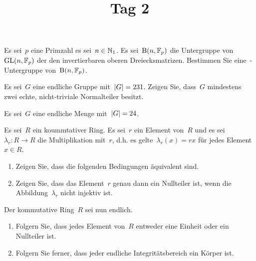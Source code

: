 \documentclass{scrartcl}
\title{Tag 2}
\author{}
\date{}
\begin{document}
\maketitle
\vspace{-6em}

\begin{exercise}
  Es sei~$p$ eine Primzahl es sei~$n \in \mathbb{N}_1$.
  Es sei~$\operatorname{B}(n, \mathbb{F}_p)$ die Untergruppe von~$\operatorname{GL}(n, \mathbb{F}_p)$ der den invertierbaren oberen Dreiecksmatrizen.
  Bestimmen Sie eine~-Untergruppe von~$\operatorname{B}(n, \mathbb{F}_p)$.
\end{exercise}

\begin{exercise}
  Es sei~$G$ eine endliche Gruppe mit~$\lvert G\rvert = 231$.
  Zeigen Sie, dass~$G$ mindestens zwei echte, nicht-triviale Normalteiler besitzt.
\end{exercise}

\begin{exercise}
  Es sei~$G$ eine endliche Menge mit~$\lvert G\rvert = 24$.
\end{exercise}

\begin{exercise}
  Es sei~$R$ ein koummtativer Ring.
  Es sei~$r$ ein Element von~$R$ und es sei~$\lambda_r \colon R \to R$ die Multiplikation mit~$r$, d.h. es gelte~$\lambda_r(x) = rx$ für jedes Element~$x \in R$.
  \begin{enumerate}
    \item
      Zeigen Sie, dass die folgenden Bedingungen äquivalent sind.
    \item
      Zeigen Sie, dass das Element~$r$ genau dann ein Nullteiler ist, wenn die Abbildung~$\lambda_r$ nicht injektiv ist.
  \end{enumerate}
  Der kommutative Ring~$R$ sei nun endlich.
  \begin{enumerate}[resume*]
    \item
      Folgern Sie, dass jedes Element von~$R$ entweder eine Einheit oder ein Nullteiler ist.
    \item
      Folgern Sie ferner, dass jeder endliche Integritätsbereich ein Körper ist.
  \end{enumerate}
\end{exercise}
\end{document}
